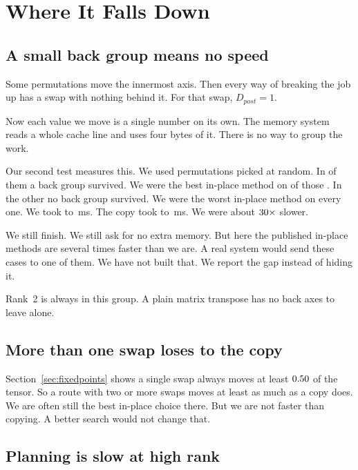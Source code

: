 \section{Where It Falls Down}
\label{sec:limits}

\subsection{A small back group means no speed}

Some permutations move the innermost axis. Then every way of breaking the job
up has a swap with nothing behind it. For that swap, $D_{post}=1$.

Now each value we move is a single number on its own. The memory system reads a
whole cache line and uses four bytes of it. There is no way to group the work.

Our second test measures this. We used \hardCases{} permutations picked at
random. In \hardBigCases{} of them a back group survived. We were the best
in-place method on \hardBigWins{} of those \hardBigCases{}. In the other
\hardSmallCases{} no back group survived. We were the worst in-place method on
every one. We took \hardSmallBoxLo{} to \hardSmallBoxHi{}\,ms. The copy took
\hardSmallContLo{} to \hardSmallContHi{}\,ms. We were about
$30\times$ slower.

We still finish. We still ask for no extra memory. But here the published
in-place methods are several times faster than we are. A real system would send
these cases to one of them. We have not built that. We report the gap instead
of hiding it.

Rank~2 is always in this group. A plain matrix transpose has no back axes to
leave alone.

\subsection{More than one swap loses to the copy}

Section~\ref{sec:fixedpoints} shows a single swap always moves at least
$0.50$ of the tensor. So a route with two or more swaps moves at
least as much as a copy does. We are often still the best in-place choice
there. But we are not faster than copying. A better search would not change
that.

\subsection{Planning is slow at high rank}

